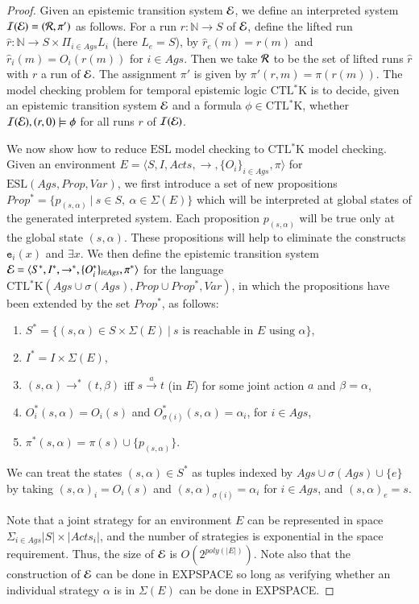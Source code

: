 \documentclass[a4wide]{article}
\newcommand{\CTLsK}{\mbox{CTL$^*$K}}
\newcommand{\ESL}{\mbox{ESL}}
\newcommand{\trans}{\rightarrow}
\newcommand{\R}{{\cal R}}
\newcommand{\ptrans}[1]{\stackrel{#1}{\longrightarrow}}
\newcommand{\Prop}{Prop}
\newcommand{\SVar}{V\!ar}
\newcommand{\nat}{\mathbb{N}}
\newcommand{\ets}{{\cal E}}
\theoremstyle{examplesty}
\newcommand{\strat}{\sigma}
\newcommand{\Ags}{\mathit{Ags}}
\newcommand{\I}{\mathcal{I}}
\newcommand{\lid}[2]{\mathtt{e}_{#1}(#2)}
\newcommand{\Env}{E}
\newcommand{\Acts}{\mathit{Acts}}
\newcommand{\be}{\begin{enumerate}}
\newcommand{\ee}{\end{enumerate}}
\newcommand{\Strat}{\Sigma}
\begin{document}
\begin{proof}
Given an epistemic transition system $\ets$, we define an interpreted system $\I(\ets) = (\R, \pi')$  
as follows. For a run $r:\nat \rightarrow S$ of $\ets$, define the lifted run $\hat{r}: \nat \rightarrow S \times \Pi_{i\in \Ags} L_i$ (here $L_e = S$), by 
$\hat{r}_e(m) = r(m)$ and  $\hat{r}_i(m) = O_i(r(m))$ for $i\in \Ags$. Then we take $\R$ to be the set of 
lifted runs $\hat{r}$ with $r$ a run of $\ets$. The assignment $\pi'$ is given by $\pi'(r,m) = \pi(r(m))$. 
The model checking problem for temporal epistemic logic 
$\CTLsK$
is to decide, 
given an epistemic transition system $\ets$ and a formula 
$\phi\in \CTLsK$, 
whether 
 $\I(\ets),(r,0)\models \phi$ for all  runs $r$ of $\I(\ets)$. 


We now show how to reduce $\ESL$ model checking to $\CTLsK$ model checking. 
Given an environment $\Env =  \langle S, I, \Acts, \trans, \{O_i\}_{i\in \Ags}, \pi\rangle$
for  
$\ESL(\Ags, \Prop, \SVar)$, we first introduce a set of new propositions
$\Prop^*= \{p_{(s,\alpha)} ~|~ s\in S, ~\alpha\in \Sigma(E)\}$
which will be interpreted at global states of the generated interpreted system. 
Each proposition $p_{(s,\alpha)}$ will be true only at the global state $(s,\alpha)$.
These propositions will help to eliminate the constructs $\lid{i}{x}$ and $\exists x$. 
We then define the epistemic transition system 
$\ets =  \langle S^*, I^*, \trans^*, \{O^*_i\}_{i\in \Ags}, \pi^*\rangle$
for the language 
$\CTLsK(\Ags\cup \strat(\Ags), \Prop\cup \Prop^*, \SVar)$, 
in which the propositions have been extended by the set 
$\Prop^*$, as follows: 
\be
\item 
$S^* = \{ (s,\alpha) \in S\times \Sigma(\Env)~|~ \text{$s$ is reachable in $E$ using $\alpha$}\}$, 

\item $I^* = I\times \Sigma(\Env)$, 
\item $(s, \alpha) \trans^* (t, \beta)$ iff $s\ptrans{a}t$ 
(in $\Env$)
for some joint action $a$ 
and $\beta = \alpha$, 
\item $O_i^*(s,\alpha) = O_i(s)$ 
and $O_{\strat(i)}^*(s,\alpha) = \alpha_i$, 
for $i\in\Ags$,

\item $\pi^*(s,\alpha) = \pi(s) \cup \{p_{(s,\alpha)}\}$.  
\ee 
We can treat the states $(s,\alpha)\in S^*$ as tuples indexed by 
$\Ags\cup \strat(\Ags)\cup \{e\}$ by taking 
$(s,\alpha)_i = O_i(s)$ and  $(s,\alpha)_{\strat(i)} = \alpha_i$ for $i\in \Ags$, and $(s,\alpha)_e = s$. 

Note that  a joint strategy for an environment $\Env$ can be represented in space 
$\Sigma_{i\in \Ags}  |S|\times |\Acts_i|$, 
and the number of strategies is exponential in the space requirement. 
Thus, the size of $\ets$ is $O(2^{poly(|\Env|)})$. 
Note also that the construction of $\ets$ can be done in EXPSPACE
so long as verifying whether an individual strategy $\alpha$ is in $\Strat(\Env)$ 
can be done in EXPSPACE. 




\end{proof}
\end{document}
